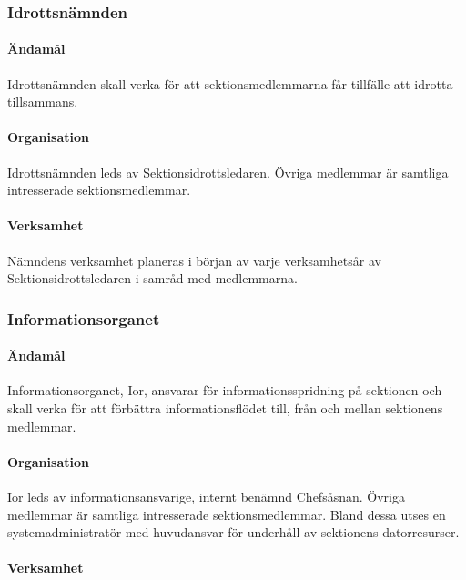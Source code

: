 \documentclass[a4paper,12pt]{article}
\begin{document}
\subsubsection{Idrottsnämnden}

\paragraph{Ändamål}

Idrottsnämnden skall verka för att sektionsmedlemmarna får tillfälle att idrotta tillsammans.

\paragraph{Organisation}

Idrottsnämnden leds av Sektionsidrottsledaren. Övriga medlemmar är samtliga intresserade sektionsmedlemmar.

\paragraph{Verksamhet}

Nämndens verksamhet planeras i början av varje verksamhetsår av Sektionsidrottsledaren i samråd med medlemmarna.

\subsubsection{Informationsorganet}

\paragraph{Ändamål}

Informationsorganet, Ior, ansvarar för informationsspridning på sektionen och skall verka för att förbättra informationsflödet till, från och mellan sektionens medlemmar.

\paragraph{Organisation}

Ior leds av informationsansvarige, internt benämnd Chefsåsnan. Övriga medlemmar är samtliga intresserade sektionsmedlemmar. Bland dessa utses en systemadministratör med huvudansvar för underhåll av sektionens datorresurser.

\paragraph{Verksamhet}
\end{document}

